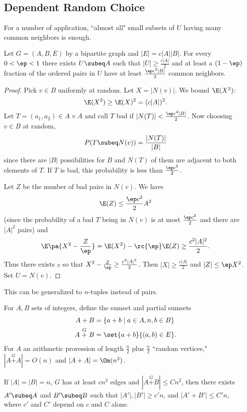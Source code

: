 
\subsection{Dependent Random Choice}
For a number of application, ``almost all" small subsets of $U$ having many common neighbors is enough.
\begin{lem}\label{drc2}
Let $G=(A,B,E)$ by a bipartite graph and $|E|=c|A||B|$. For every $0<\ep<1$ there exists $U\subeq A$ such that $|U|\ge\frac{c|A|}{2}$ and at least a $(1-\ep)$ fraction of the ordered pairs in $U$ have at least $\frac{\ep c^2|B|}{2}$ common neighbors.
\end{lem}
\begin{proof}
Pick $v\in B$ uniformly at random. Let $X=|N(v)|$. We bound $\E(X^2)$:
\[
\E(X^2)\ge\E(X)^2=(c|A|)^2.
\]
Let $T=(a_1,a_2)\in A\times A$ and call $T$ bad if $|N(T)|<\frac{\ep c^2|B|}{2}$. Now choosing $v\in B$ at random,
\[
P(T\subeq N(v))=\frac{|N(T)|}{|B|}
\]
since there are $|B|$ possibilities for $B$ and $N(T)$ of them are adjacent to both elements of $T$. 
If $T$ is bad, this probability is less than $\frac{\ep c^2}{2}$. %

Let $Z$ be the number of bad pairs in $N(v)$. We have
\[
\E(Z)\le\frac{\ep c^2}{2}A^2 
\]
(since the probability of a bad $T$ being in $N(v)$ is at most $\frac{\ep c^2}{2}$ and there are $|A|^2$ pairs) 
and 
\[
\E\pa{X^2-\frac Z{\ep}}=\E(X^2)-\rc{\ep}\E(Z)\ge \frac{c^2|A|^2}{2}.
\]
Thus there exists $v$ so that $X^2-\frac{Z}{\ep}\ge \frac{c^2|A|^2}{2}$. Then $|X|\ge \frac{c|A|}{2}$ and $|Z|\le \ep X^2$. Set $U=N(v)$.
\end{proof}
This can be generalized to $n$-tuples instead of pairs.

For $A,B$ sets of integers, define the sumset and partial sumsets
\begin{align*}
A+B&=\{a+b\mid a\in A,n, b\in B\}\\
A\stackrel{G}{+}B&=\set{a+b}{(a,b)\in E}.
\end{align*}
For $A$ an arithmetic proression of length $\frac n2$ plus $\frac n2$ ``random vertices," $|A\stackrel{G}{+}A|=O(n)$ and $|A+A|=\Om(n^2)$.
\begin{thm}\label{balogs} If $|A|=|B|=n$, $G$ has at least $cn^2$ edges and $|A\stackrel{G}{+}B|\le Cn^2$, then there exists $A'\subeq A$ and $B'\subeq B$ such that $|A'|,|B'|\ge c'n$, and $|A'+B'|\le C'n$, where $c'$ and $C'$ depend on $c$ and $C$ alone.\end{thm}

